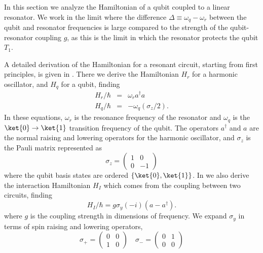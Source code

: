 
In this section we analyze the Hamiltonian of a qubit coupled to a linear resonator.
We work in the limit where the difference $\Delta \equiv \omega_q - \omega_r$ between the qubit and resonator frequencies is large compared to the strength of the qubit-resonator coupling $g$, as this is the limit in which the resonator protects the qubit $T_1$.

A detailed derivation of the Hamiltonian for a resonant circuit, starting from first principles, is given in \citeinternaltype {}.
There we derive the Hamiltonian $H_r$ for a harmonic oscillator, and $H_q$ for a qubit, finding \begin{eqnarray}
H_r/\hbar &=& \omega_r a^{\dagger}a \\
H_q/\hbar &=& - \omega_q (\sigma_z/2) . \end{eqnarray}
In these equations, $\omega_r$ is the resonance frequency of the resonator and $\omega_q$ is the $\ket{0}\rightarrow \ket{1}$ transition frequency of the qubit.
The operators $a^{\dagger}$ and $a$ are the normal raising and lowering operators for the harmonic oscillator, and $\sigma_z$ is the Pauli matrix represented as \begin{equation}
\sigma_z = \left( \begin{array}{cc} 1 & 0 \\ 0 & -1 \end{array} \right) \end{equation}
where the qubit basis states are ordered $\left\{ \ket{0}, \ket{1} \right\}$.
In \citeinternaltype {} we also derive the interaction Hamiltonian $H_I$ which comes from the coupling between two circuits, finding \begin{equation}
H_I/\hbar = g \sigma_y (-i)(a - a^{\dagger}) . \end{equation}
where $g$ is the coupling strength in dimensions of frequency.
We expand $\sigma_y$ in terms of spin raising and lowering operators, \begin{equation}
\sigma_+ = \left( \begin{array}{cc} 0 & 0 \\ 1 & 0 \end{array} \right) \quad
\sigma_- = \left( \begin{array}{cc} 0 & 1 \\ 0 & 0 \end{array} \right) \end{equation}
